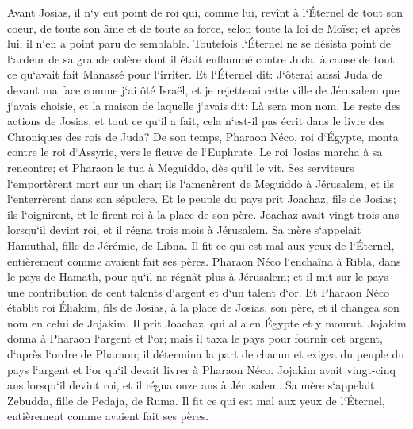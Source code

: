 \verse Avant Josias, il n`y eut point de roi qui, comme lui, revînt à l`Éternel de tout son coeur, de toute son âme et de toute sa force, selon toute la loi de Moïse; et après lui, il n`en a point paru de semblable. 
\verse Toutefois l`Éternel ne se désista point de l`ardeur de sa grande colère dont il était enflammé contre Juda, à cause de tout ce qu`avait fait Manassé pour l`irriter. 
\verse Et l`Éternel dit: J`ôterai aussi Juda de devant ma face comme j`ai ôté Israël, et je rejetterai cette ville de Jérusalem que j`avais choisie, et la maison de laquelle j`avais dit: Là sera mon nom. 
\verse Le reste des actions de Josias, et tout ce qu`il a fait, cela n`est-il pas écrit dans le livre des Chroniques des rois de Juda? 
\verse De son temps, Pharaon Néco, roi d`Égypte, monta contre le roi d`Assyrie, vers le fleuve de l`Euphrate. Le roi Josias marcha à sa rencontre; et Pharaon le tua à Meguiddo, dès qu`il le vit. 
\verse Ses serviteurs l`emportèrent mort sur un char; ils l`amenèrent de Meguiddo à Jérusalem, et ils l`enterrèrent dans son sépulcre. Et le peuple du pays prit Joachaz, fils de Josias; ils l`oignirent, et le firent roi à la place de son père. 
\verse Joachaz avait vingt-trois ans lorsqu`il devint roi, et il régna trois mois à Jérusalem. Sa mère s`appelait Hamuthal, fille de Jérémie, de Libna. 
\verse Il fit ce qui est mal aux yeux de l`Éternel, entièrement comme avaient fait ses pères. 
\verse Pharaon Néco l`enchaîna à Ribla, dans le pays de Hamath, pour qu`il ne régnât plus à Jérusalem; et il mit sur le pays une contribution de cent talents d`argent et d`un talent d`or. 
\verse Et Pharaon Néco établit roi Éliakim, fils de Josias, à la place de Josias, son père, et il changea son nom en celui de Jojakim. Il prit Joachaz, qui alla en Égypte et y mourut. 
\verse Jojakim donna à Pharaon l`argent et l`or; mais il taxa le pays pour fournir cet argent, d`après l`ordre de Pharaon; il détermina la part de chacun et exigea du peuple du pays l`argent et l`or qu`il devait livrer à Pharaon Néco. 
\verse Jojakim avait vingt-cinq ans lorsqu`il devint roi, et il régna onze ans à Jérusalem. Sa mère s`appelait Zebudda, fille de Pedaja, de Ruma. 
\verse Il fit ce qui est mal aux yeux de l`Éternel, entièrement comme avaient fait ses pères. 

